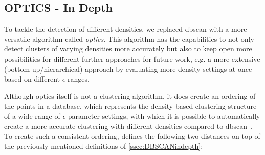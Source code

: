 \subsection{OPTICS - In Depth}\label{ssec:OPTICSindepth} %
To tackle the detection of different densities, we replaced \gls{dbscan} with a more versatile algorithm called \textit{\acrfull{optics}}. This algorithm has the capabilities to not only detect clusters of varying densities more accurately but also to keep open more possibilities for different further approaches for future work, e.g. a more extensive (bottom-up/hierarchical) approach by evaluating more density-settings at once based on different $\epsilon$-ranges.

Although \gls{optics} itself is not a clustering algorithm, it does create an ordering of the points in a database, which represents the density-based clustering structure of a wide range of $\epsilon$-parameter settings, with which it is possible to automatically create a more accurate clustering with different densities compared to \gls{dbscan}~\cite{opticsankerst1999optics}. To create such a consistent ordering, \citeauthor{opticsankerst1999optics} defines the following two distances on top of the previously mentioned definitions of \autoref{ssec:DBSCANindepth}:  
\vspace{5mm}

